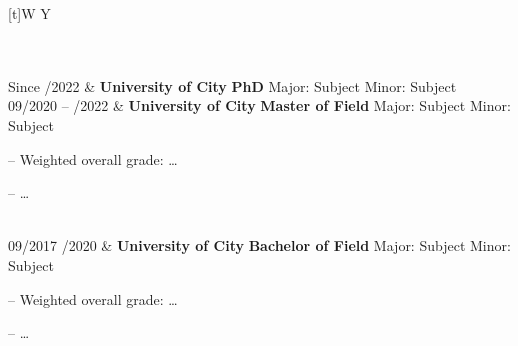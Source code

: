 \begin{xltabular}{\textwidth}[t]{W Y}

 \hrulefill \\ \\ 

Since /2022 			&	\textbf{University of City} \newline
						\textbf{PhD} \newline
						Major: Subject \newline
						Minor: Subject \newline
						\\
					
09/2020 – /2022 			&	\textbf{University of City} \newline
						\textbf{Master of Field} \newline
						Major: Subject \newline
						Minor: Subject
						\begin{compactitem}
							\item[–] Weighted overall grade: \dots
							\item[–] \dots
						\end{compactitem}
						\\
					
09/2017 /2020 			&	\textbf{University of City} \newline
						\textbf{Bachelor of Field} \newline
						Major: Subject \newline
						Minor: Subject
						\begin{compactitem}
							\item[–] Weighted overall grade: \dots
							\item[–] \dots
						\end{compactitem}
						\\

\end{xltabular}